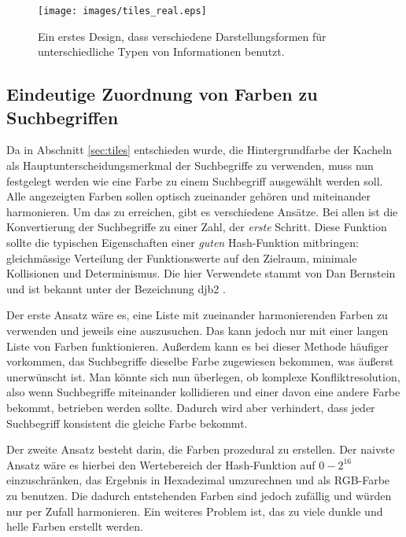 \documentclass[12pt,twoside]{book}
\begin{document}
\begin{figure}[htbp]
    \centering
    \texttt{[image: images/tiles\_real.eps]}
    \caption{Ein erstes Design, dass verschiedene Darstellungsformen für unterschiedliche Typen von Informationen benutzt.}
    \label{fig:awesome_image}
\end{figure}

\subsection{Eindeutige Zuordnung von Farben zu Suchbegriffen}

Da in Abschnitt \ref{sec:tiles} entschieden wurde, die Hintergrundfarbe der Kacheln als Hauptunterscheidungsmerkmal der Suchbegriffe zu verwenden, muss nun festgelegt werden wie eine Farbe zu einem Suchbegriff ausgewählt werden soll.
Alle angezeigten Farben sollen optisch zueinander gehören und miteinander harmonieren. Um das zu erreichen, gibt es verschiedene Ansätze. Bei allen ist die Konvertierung der Suchbegriffe zu einer Zahl, der \textit{erste} Schritt. Diese Funktion sollte die typischen Eigenschaften einer \textit{guten} Hash-Funktion mitbringen: gleichmässige Verteilung der Funktionswerte auf den Zielraum, minimale Kollisionen und Determinismus.
Die hier Verwendete stammt von Dan Bernstein und ist bekannt unter der Bezeichnung djb2 \cite{djb2}.

Der erste Ansatz wäre es, eine Liste mit zueinander harmonierenden Farben zu verwenden und jeweils eine auszusuchen. Das kann jedoch nur mit einer langen Liste von Farben funktionieren. Außerdem kann es bei dieser Methode häufiger vorkommen, das Suchbegriffe dieselbe Farbe zugewiesen bekommen, was äußerst unerwünscht ist. Man könnte sich nun überlegen, ob komplexe Konfliktresolution, also wenn Suchbegriffe miteinander kollidieren und einer davon eine andere Farbe bekommt, betrieben werden sollte.
Dadurch wird aber verhindert, dass jeder Suchbegriff konsistent die gleiche Farbe bekommt.


Der zweite Ansatz besteht darin, die Farben prozedural zu erstellen.
Der naivste Ansatz wäre es hierbei den Wertebereich der Hash-Funktion auf $0 - 2^{16}$ einzuschränken, das Ergebnis in Hexadezimal umzurechnen und als RGB-Farbe zu benutzen. Die dadurch entstehenden Farben sind jedoch zufällig und würden nur per Zufall harmonieren. Ein weiteres Problem ist, das zu viele dunkle und helle Farben erstellt werden.
\end{document}
